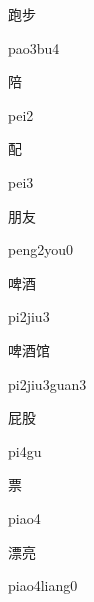 \begin{multicols*}{2}
\begin{verbete}[pao3bu4]{跑步}
\begin{pronuncia}{pao3bu4}
\end{pronuncia}
\end{verbete}

\begin{verbete}[pei2]{陪}
\begin{pronuncia}{pei2}
\end{pronuncia}
\end{verbete}

\begin{verbete}[pei3]{配}
\begin{pronuncia}{pei3}
\end{pronuncia}
\end{verbete}

\begin{verbete}{朋友}
\begin{pronuncia}{peng2you0}
\end{pronuncia}
\end{verbete}

\begin{verbete}[pi2jiu3]{啤酒}
\begin{pronuncia}{pi2jiu3}
\end{pronuncia}
\end{verbete}

\begin{verbete}{啤酒馆}
\begin{pronuncia}{pi2jiu3guan3}
\end{pronuncia}
\end{verbete}

\begin{verbete}[pi4gu]{屁股}
\begin{pronuncia}{pi4gu}
\end{pronuncia}
\end{verbete}

\begin{verbete}[piao4]{票}
\begin{pronuncia}{piao4}
\end{pronuncia}
\end{verbete}

\begin{verbete}{漂亮}
\begin{pronuncia}{piao4liang0}
\end{pronuncia}
\end{verbete}


\end{multicols*}
